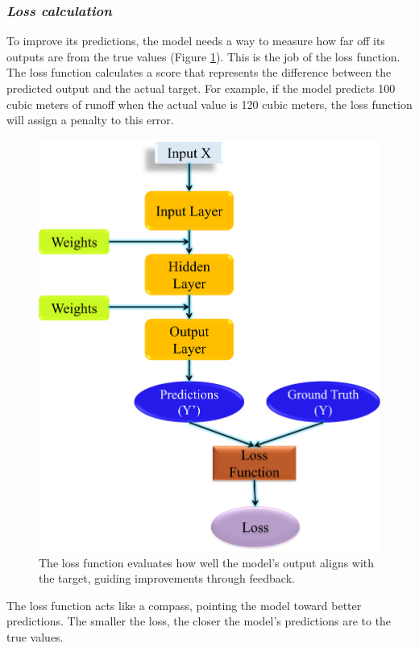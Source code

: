 \subsubsection*{\textit{Loss calculation}}
To improve its predictions, the model needs a way to measure how far off its outputs are from the true values (Figure \ref{fig:dl_mech2}). This is the job of the loss function. The loss function calculates a score that represents the difference between the predicted output and the actual target. For example, if the model predicts 100 cubic meters of runoff when the actual value is 120 cubic meters, the loss function will assign a penalty to this error.
\begin{figure}[h]
    \centering
    \includegraphics[width=0.4\linewidth]{images/dl_mech2.png}
    \caption{The loss function evaluates how well the model's output aligns with the target, guiding improvements through feedback.}
    \label{fig:dl_mech2}
\end{figure}
The loss function acts like a compass, pointing the model toward better predictions. The smaller the loss, the closer the model’s predictions are to the true values.
